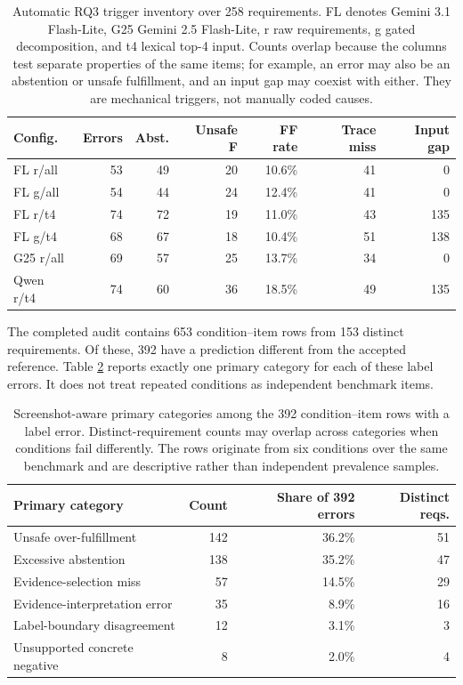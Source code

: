 \begin{table}[htbp]
  \centering
  \small
  \begin{tabular}{@{}lrrr@{\hspace{1.25em}}rrr@{}}
    \toprule
    Config. & Errors & Abst. & Unsafe F & FF rate & Trace miss & Input gap \\
    \midrule
    FL r/all   & 53 & 49 & 20 & 10.6\% & 41 & 0 \\
    FL g/all   & 54 & 44 & 24 & 12.4\% & 41 & 0 \\
    FL r/t4    & 74 & 72 & 19 & 11.0\% & 43 & 135 \\
    FL g/t4    & 68 & 67 & 18 & 10.4\% & 51 & 138 \\
    G25 r/all  & 69 & 57 & 25 & 13.7\% & 34 & 0 \\
    Qwen r/t4  & 74 & 60 & 36 & 18.5\% & 49 & 135 \\
    \bottomrule
  \end{tabular}
  \caption{Automatic RQ3 trigger inventory over 258 requirements. FL denotes
  Gemini 3.1 Flash-Lite, G25 Gemini 2.5 Flash-Lite, r raw requirements, g gated
  decomposition, and t4 lexical top-4 input. Counts overlap because the columns
  test separate properties of the same items; for example, an error may also be
  an abstention or unsafe fulfillment, and an input gap may coexist with either.
  They are mechanical triggers, not manually coded causes.}
  \label{tab:rq3-trigger-inventory}
\end{table}
\FloatBarrier

The completed audit contains 653 condition--item rows from 153 distinct
requirements. Of these, 392 have a prediction different from the accepted
reference. Table \ref{tab:rq3-visual-error-categories} reports exactly one
primary category for each of these label errors. It does not treat repeated
conditions as independent benchmark items.

\begin{table}[htbp]
  \centering
  \small
  \begin{tabular}{@{}lrrr@{}}
    \toprule
    Primary category & Count & Share of 392 errors & Distinct reqs. \\
    \midrule
    Unsafe over-fulfillment       & 142 & 36.2\% & 51 \\
    Excessive abstention          & 138 & 35.2\% & 47 \\
    Evidence-selection miss       &  57 & 14.5\% & 29 \\
    Evidence-interpretation error &  35 &  8.9\% & 16 \\
    Label-boundary disagreement   &  12 &  3.1\% &  3 \\
    Unsupported concrete negative &   8 &  2.0\% &  4 \\
    \bottomrule
  \end{tabular}
  \caption{Screenshot-aware primary categories among the 392 condition--item
  rows with a label error. Distinct-requirement counts may overlap across
  categories when conditions fail differently. The rows originate from six
  conditions over the same benchmark and are descriptive rather than
  independent prevalence samples.}
  \label{tab:rq3-visual-error-categories}
\end{table}
\FloatBarrier

